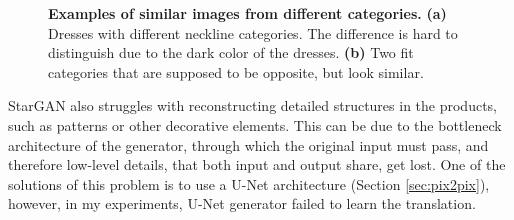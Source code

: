 \documentclass[12pt]{report}
\begin{document}
\begin{figure}[h]
\centering
{}
\vspace{0.2cm}
\caption{\label{fig:problem_data} \textbf{Examples of similar images from different categories.} \textbf{(a)} Dresses with different neckline categories. The difference is hard to distinguish due to the dark color of the dresses. \textbf{(b)} Two fit categories that are supposed to be opposite, but look similar.}
\end{figure}

StarGAN also struggles with reconstructing detailed structures in the products, such as patterns or other decorative elements. This can be due to the bottleneck architecture of the generator, through which the original input must pass, and therefore low-level details, that both input and output share, get lost. One of the solutions of this problem is to use a U-Net architecture (Section \ref{sec:pix2pix}), however, in my experiments, U-Net generator failed to learn the translation.
\end{document}
